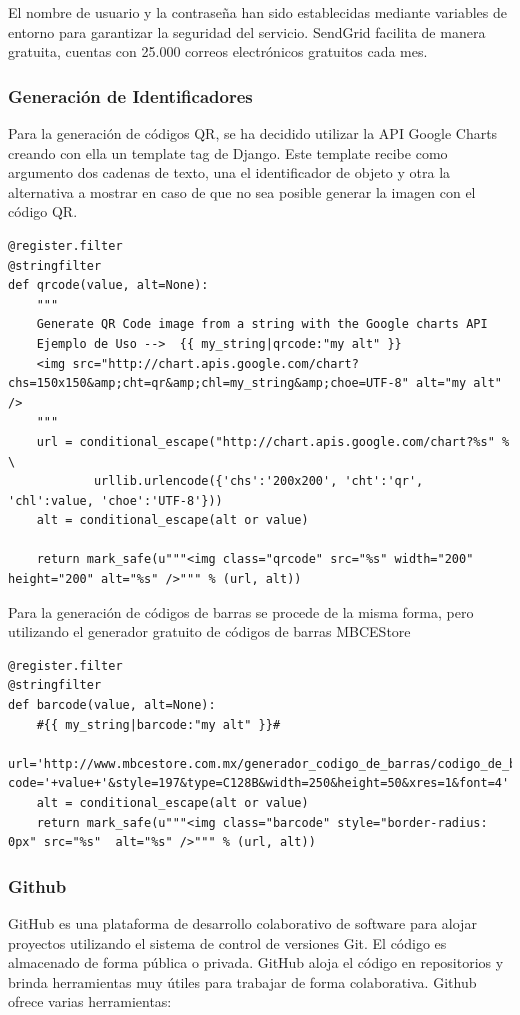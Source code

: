 \documentclass[a4paper,11pt]{book}
\begin{document}
El nombre de usuario y la contraseña han sido establecidas mediante variables de entorno para garantizar la seguridad del servicio. SendGrid facilita de manera gratuita, cuentas con 25.000 correos electrónicos gratuitos cada mes.

\subsubsection{Generación de Identificadores }

Para la generación de códigos QR, se ha decidido utilizar la API  Google Charts\cite{googleqr} creando con ella un template tag de Django. Este template recibe como argumento dos cadenas de texto, una el identificador de objeto y otra la alternativa a mostrar en caso de que no sea posible generar la imagen con el código QR. 

\begin{lstlisting}
@register.filter
@stringfilter
def qrcode(value, alt=None):
    """
    Generate QR Code image from a string with the Google charts API
    Ejemplo de Uso -->  {{ my_string|qrcode:"my alt" }}
    <img src="http://chart.apis.google.com/chart?chs=150x150&amp;cht=qr&amp;chl=my_string&amp;choe=UTF-8" alt="my alt" />
    """
    url = conditional_escape("http://chart.apis.google.com/chart?%s" % \
            urllib.urlencode({'chs':'200x200', 'cht':'qr', 'chl':value, 'choe':'UTF-8'}))
    alt = conditional_escape(alt or value)

    return mark_safe(u"""<img class="qrcode" src="%s" width="200" height="200" alt="%s" />""" % (url, alt))
\end{lstlisting}

Para la generación de códigos de barras se procede de la misma forma, pero utilizando el generador gratuito de códigos de barras MBCEStore\cite{barras} 

\begin{lstlisting}
@register.filter
@stringfilter
def barcode(value, alt=None):
    #{{ my_string|barcode:"my alt" }}#
    url='http://www.mbcestore.com.mx/generador_codigo_de_barras/codigo_de_barras.html?code='+value+'&style=197&type=C128B&width=250&height=50&xres=1&font=4'
    alt = conditional_escape(alt or value)
    return mark_safe(u"""<img class="barcode" style="border-radius: 0px" src="%s"  alt="%s" />""" % (url, alt))
\end{lstlisting}

\subsubsection{Github}
GitHub\cite{github} es una plataforma de desarrollo colaborativo de software para alojar proyectos utilizando el sistema de control de versiones Git. El código es almacenado de forma pública o privada. GitHub aloja el código en repositorios y brinda herramientas muy útiles para trabajar de forma colaborativa. Github\cite{github2} ofrece varias herramientas:
\end{document}
